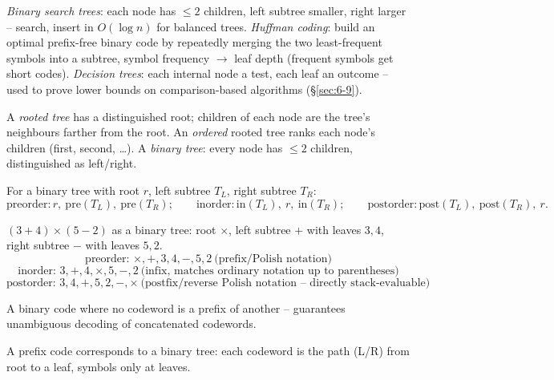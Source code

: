 \documentclass[11pt]{article}
\begin{document}
\bigskip
\begin{note}
\emph{Binary search trees}: each node has $\le2$ children, left subtree smaller, right larger -- search, insert in $O(\log n)$ for balanced trees. \emph{Huffman coding}: build an optimal prefix-free binary code by repeatedly merging the two least-frequent symbols into a subtree, symbol frequency $\to$ leaf depth (frequent symbols get short codes). \emph{Decision trees}: each internal node a test, each leaf an outcome -- used to prove lower bounds on comparison-based algorithms (\S\ref{sec:6-9}).
\end{note}

\begin{definition}
A \emph{rooted tree} has a distinguished root; children of each node are the tree's neighbours farther from the root. An \emph{ordered} rooted tree ranks each node's children (first, second, \dots). A \emph{binary tree}: every node has $\le2$ children, distinguished as left/right.
\end{definition}

\begin{note}
For a binary tree with root $r$, left subtree $T_L$, right subtree $T_R$:
\[
\text{preorder}: r,\ \mathrm{pre}(T_L),\ \mathrm{pre}(T_R); \qquad
\text{inorder}: \mathrm{in}(T_L),\ r,\ \mathrm{in}(T_R); \qquad
\text{postorder}: \mathrm{post}(T_L),\ \mathrm{post}(T_R),\ r.
\]
\end{note}

\begin{example}
$(3+4)\times(5-2)$ as a binary tree: root $\times$, left subtree $+$ with leaves $3,4$, right subtree $-$ with leaves $5,2$.
\[
\text{preorder: } \times,+,3,4,-,5,2 \ \text{(prefix/Polish notation)}
\]
\[
\text{inorder: } 3,+,4,\times,5,-,2 \ \text{(infix, matches ordinary notation up to parentheses)}
\]
\[
\text{postorder: } 3,4,+,5,2,-,\times \ \text{(postfix/reverse Polish notation -- directly stack-evaluable)}
\]
\end{example}

\begin{definition}
A binary code where no codeword is a prefix of another -- guarantees unambiguous decoding of concatenated codewords.
\end{definition}

\begin{note}
A prefix code corresponds to a binary tree: each codeword is the path (L/R) from root to a leaf, symbols only at leaves.
\end{note}
\end{document}
